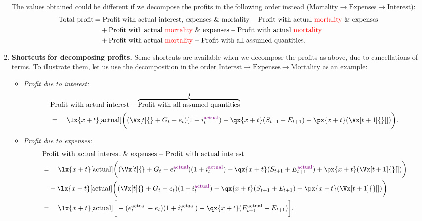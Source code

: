\begin{enumerate}
The values obtained could be different if we decompose the profits in the
following order instead
(\(\text{Mortality}\to\text{Expenses}\to\text{Interest}\)):
\begin{align*}
\text{Total profit}&=\text{Profit with actual interest, expenses \& mortality}-\text{Profit with actual {\color{red}mortality} \& expenses} \\
&\quad+\text{Profit with actual {\color{red}mortality} \& expenses}-\text{Profit with actual {\color{red}mortality}} \\
&\quad+\text{Profit with actual {\color{red}mortality}}-\text{Profit with all assumed quantities}.
\end{align*}
\item \textbf{Shortcuts for decomposing profits.} Some shortcuts are available
when we decompose the profits as above, due to cancellations of terms. To
illustrate them, let us use the decomposition in the order
\(\text{Interest}\to\text{Expenses}\to\text{Mortality}\) as an example:
\begin{itemize}
\item \emph{Profit due to interest:}
\begin{align*}
&\text{Profit with actual interest}-\overbrace{\text{Profit with all assumed quantities}}^{0} \\
&=\quad\lx{x+t}[\mathrm{actual}]\bigg(
(\Vx[t]{}+G_t-e_t)(1+i_t^{\vc{\mathrm{actual}}})
-\qx{x+t}(S_{t+1}+E_{t+1})
+\px{x+t}(\Vx[t+1]{}[])\bigg).
\end{align*}

\item \emph{Profit due to expenses:}
\begin{align*}
&\text{Profit with actual interest \& expenses}
-\text{Profit with actual interest} \\
&=\quad\lx{x+t}[\mathrm{actual}]\bigg(
(\Vx[t]{}+G_t-e_t^{\vc{\mathrm{actual}}})(1+i_t^{\vc{\mathrm{actual}}})
-\qx{x+t}(S_{t+1}+E_{t+1}^{\vc{\mathrm{actual}}})
+\px{x+t}(\Vx[t+1]{}[])\bigg) \\
&\quad-\lx{x+t}[\mathrm{actual}]\bigg(
(\Vx[t]{}+G_t-e_t)(1+i_t^{\vc{\mathrm{actual}}})
-\qx{x+t}(S_{t+1}+E_{t+1})
+\px{x+t}(\Vx[t+1]{}[])\bigg) \\
&=\quad\lx{x+t}[\mathrm{actual}]\bigg[-(e_{t}^{\mathrm{actual}}-e_{t})(1+i_{t}^{\mathrm{actual}})
-\qx{x+t}(E_{t+1}^{\mathrm{actual}}-E_{t+1})\bigg].
\end{align*}


\end{itemize}
\end{enumerate}
